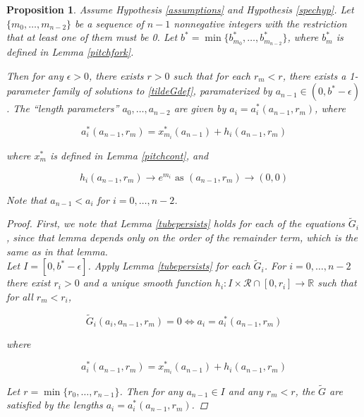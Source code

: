 \documentclass[12pt]{article}
\def\R{{\mathbb R}}
\newtheorem{proposition}{Proposition}
\begin{document}
\begin{proposition}
Assume Hypothesis \ref{assumptions} and Hypothesis \ref{spechyp}. Let $\{ m_0, \dots, m_{n-2} \}$ be a sequence of $n - 1$ nonnegative integers with the restriction that at least one of them must be 0. Let $b^* = \min\{b^*_{m_0}, \dots, b^*_{m_{n-2}}\}$, where $b^*_m$ is defined in Lemma \ref{pitchfork}.

Then for any $\epsilon > 0$, there exists $r > 0$ such that for each $r_m < r$, there exists a 1-parameter family of solutions to \eqref{tildeGdef}, paramaterized by $a_{n-1} \in (0, b^* - \epsilon)$. The ``length parameters'' $a_0, \dots, a_{n-2}$ are given by $a_i = a_i^*(a_{n-1}, r_m)$, where

\begin{equation}
a_i^*(a_{n-1}, r_m) = x_{m_i}^*(a_{n-1}) + h_i(a_{n-1}, r_m)
\end{equation}

where $x_m^*$ is defined in Lemma \ref{pitchcont}, and 

\[
h_i(a_{n-1}, r_m) \rightarrow e^{m_i}  \text{ as }
(a_{n-1}, r_m) \rightarrow (0, 0)
\]

Note that $a_{n-1} < a_i$ for $i = 0, \dots, n-2$.

\begin{proof}
First, we note that Lemma \ref{tubepersists} holds for each of the equations $\tilde{G}_i$, since that lemma depends only on the order of the remainder term, which is the same as in that lemma.\\

Let $I = [0, b^* - \epsilon]$. Apply Lemma \ref{tubepersists} for each $\tilde{G}_i$. For $i = 0, \dots, n-2$ there exist $r_i > 0$ and a unique smooth function $h_i: I \times \mathcal{R} \cap [0, r_i] \rightarrow \R$ such that for all $r_m < r_i$, 

\begin{equation}
\tilde{G}_i(a_i, a_{n-1}, r_m) = 0 \iff 
a_i = a_i^*(a_{n-1}, r_m)
\end{equation}

where

\begin{equation}
a_i^*(a_{n-1}, r_m) = x_{m_i}^*(a_{n-1}) + h_i(a_{n-1}, r_m)
\end{equation}

Let $r = \min \{ r_0, \dots, r_{n-1} \}$. Then for any  $a_{n-1} \in I$ and any $r_m < r$, the $\tilde{G}$ are satisfied by the lengths $a_i = a_i^*(a_{n-1}, r_m)$.

\end{proof}
\end{proposition}
\end{document}
